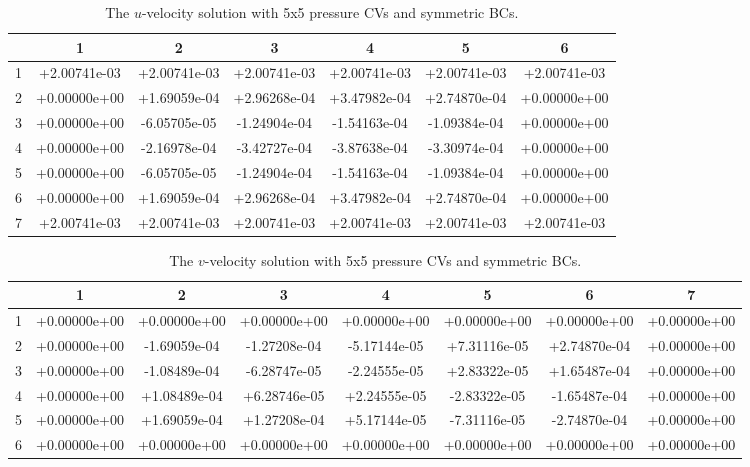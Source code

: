 \documentclass{article}
\begin{document}
\def\arraystretch{1.3}
\begin{table}[H]
	\scriptsize
	\centering
	\caption{The $u$-velocity solution with 5x5 pressure CVs and symmetric BCs.}
	\vspace{0.2cm}
	\begin{tabular}{c|S|S|S|S|S|S}
		& {1} & {2} & {3} & {4} & {5} & {6} \\
		 & +2.00741e-03 & +2.00741e-03 & +2.00741e-03 & +2.00741e-03 & +2.00741e-03 & +2.00741e-03 \\
		2 & +0.00000e+00 & +1.69059e-04 & +2.96268e-04 & +3.47982e-04 & +2.74870e-04 & +0.00000e+00 \\
		3 & +0.00000e+00 & -6.05705e-05 & -1.24904e-04 & -1.54163e-04 & -1.09384e-04 & +0.00000e+00 \\
		4 & +0.00000e+00 & -2.16978e-04 & -3.42727e-04 & -3.87638e-04 & -3.30974e-04 & +0.00000e+00 \\
		5 & +0.00000e+00 & -6.05705e-05 & -1.24904e-04 & -1.54163e-04 & -1.09384e-04 & +0.00000e+00 \\
		6 & +0.00000e+00 & +1.69059e-04 & +2.96268e-04 & +3.47982e-04 & +2.74870e-04 & +0.00000e+00 \\
		7 & +2.00741e-03 & +2.00741e-03 & +2.00741e-03 & +2.00741e-03 & +2.00741e-03 & +2.00741e-03
	\end{tabular}
	\label{table:symmetric-u}
\end{table}

\def\arraystretch{1.3}
\begin{table}[H]
	\scriptsize
	\centering
	\caption{The $v$-velocity solution with 5x5 pressure CVs and symmetric BCs.}
	\vspace{0.2cm}
	\begin{tabular}{c|S|S|S|S|S|S|S}
		& {1} & {2} & {3} & {4} & {5} & {6} & {7} \\
		 & +0.00000e+00 & +0.00000e+00 & +0.00000e+00 & +0.00000e+00 & +0.00000e+00 & +0.00000e+00 & +0.00000e+00 \\
		2 & +0.00000e+00 & -1.69059e-04 & -1.27208e-04 & -5.17144e-05 & +7.31116e-05 & +2.74870e-04 & +0.00000e+00 \\
		3 & +0.00000e+00 & -1.08489e-04 & -6.28747e-05 & -2.24555e-05 & +2.83322e-05 & +1.65487e-04 & +0.00000e+00 \\
		4 & +0.00000e+00 & +1.08489e-04 & +6.28746e-05 & +2.24555e-05 & -2.83322e-05 & -1.65487e-04 & +0.00000e+00 \\
		5 & +0.00000e+00 & +1.69059e-04 & +1.27208e-04 & +5.17144e-05 & -7.31116e-05 & -2.74870e-04 & +0.00000e+00 \\
		6 & +0.00000e+00 & +0.00000e+00 & +0.00000e+00 & +0.00000e+00 & +0.00000e+00 & +0.00000e+00 & +0.00000e+00
	\end{tabular}
	\label{table:symmetric-v}
\end{table}
\end{document}
